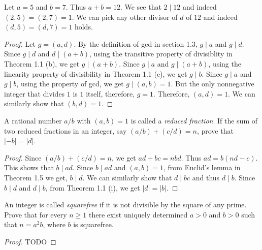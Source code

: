 \begin{example}
  Let \( a = 5 \) and \( b = 7 \). Thus \( a + b = 12 \). We see that
  \( 2 \mid 12 \) and indeed \( (2, 5) = (2, 7) = 1 \). We can pick
  any other divisor of \( d \) of \( 12 \) and indeed \( (d, 5) = (d,
  7) = 1 \) holds.
\end{example}

\begin{proof}
  Let \( g = (a, d) \). By the definition of gcd in section 1.3, \( g
  \mid a \) and \( g \mid d \). Since \( g \mid d \) and \( d \mid (a
  + b) \), using the transitive property of divisiblity in Theorem 1.1
  (b), we get \( g \mid (a + b) \). Since \( g \mid a \) and \( g \mid
  (a + b) \), using the linearity property of divisibility in Theorem
  1.1 (c), we get \( g \mid b \). Since \( g \mid a \) and \( g \mid b
  \), using the property of gcd, we get \( g \mid (a, b) = 1 \). But
  the only nonnegative integer that divides \( 1 \) is \( 1 \) itself,
  therefore, \( g = 1 \). Therefore, \( (a, d) = 1 \). We can
  similarly show that \( (b, d) = 1 \).
\end{proof}


\begin{exercise}{1.7}
  A rational number \( a/b \) with \( (a, b) = 1 \) is called a
  \emph{reduced fraction}. If the sum of two reduced fractions in an
  integer, say \( (a/b) + (c/d) = n \), prove that \( \lvert -b \rvert
  = \lvert d \rvert \).
\end{exercise}

\begin{proof}
  Since \( (a/b) + (c/d) = n \), we get \( ad + bc = nbd \). Thus \(
  ad = b(nd - c) \). This shows that \( b \mid ad \). Since \( b \mid
  ad \) and \( (a, b) = 1 \), from Euclid's lemma in Theorem 1.5 we
  get, \( b \mid d \). We can similarly show that \( d \mid bc \) and
  thus \( d \mid b \). Since \( b \mid d \) and \( d \mid b \), from
  Theorem 1.1 (i), we get \( \lvert d \rvert = \lvert b \rvert \).
\end{proof}


\begin{exercise}{1.8}
  An integer is called \emph{squarefree} if it is not divisible by the
  square of any prime. Prove that for every \( n \ge 1 \) there exist
  uniquely determined \( a > 0 \) and \( b > 0 \) such that \( n = a^2
  b \), where \( b \) is squarefree.
\end{exercise}

\begin{proof}
  TODO
\end{proof}






